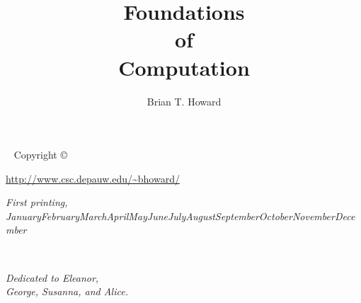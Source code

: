 \documentclass{tufte-book}
\title[Foundations of Computation]{%
  \setlength{\parindent}{0pt}Foundations\\ of\\ Computation}
\author{Brian T. Howard}
\newcommand{\0}{\ensuremath{\mathtt{0}}}
\newcommand{\1}{\ensuremath{\mathtt{1}}}
\newcommand{\monthyear}{\ifcase\month\or January\or February\or March\or April\or May\or June\or July\or August\or September\or October\or November\or December\fi\space\number\year} %
\newcommand{\openepigraph}[2]{ %
\begin{fullwidth}
\sffamily\large
\begin{doublespace}
\noindent\allcaps{#1}\\ %
\noindent\allcaps{#2} %
\end{doublespace}
\end{fullwidth}
}
\begin{document}
\setcounter{tocdepth}{2}
\frontmatter


\maketitle

\newpage
\begin{fullwidth}
~\vfill
\thispagestyle{empty}
\setlength{\parindent}{0pt}
\setlength{\parskip}{\baselineskip}
Copyright \copyright\ \the\year\ \thanklessauthor

\par{}

\par\url{http://www.csc.depauw.edu/~bhoward/}

\par \doclicenseThis{}

\par\textit{First printing, \monthyear}
\end{fullwidth}

\tableofcontents

\listoffigures

\listoftables

\cleardoublepage
~\vfill
\begin{doublespace}
\noindent\fontsize{18}{22}\selectfont\itshape
\nohyphenation
Dedicated to Eleanor,\\
George, Susanna, and Alice.
\end{doublespace}
\vfill
\vfill

\cleardoublepage


\mainmatter



\backmatter


\cleardoublepage
{}
\printindex
\end{document}

